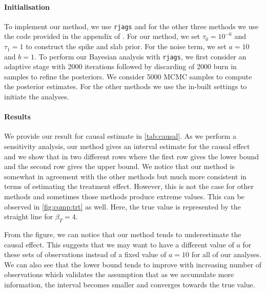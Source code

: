 \documentclass[preprint,12pt]{elsarticle}
\begin{document}
\paragraph{Initialisation} 
To implement our method, we use \texttt{rjags} and for the other three
methods we use the code provided in the appendix of \cite{koch2020}.
For our method, we set $\tau_0=10^{-6}$ and $\tau_1=1$ to construct the
spike and slab prior. For the noise term, we set $a=10$ and $b=1$.  To perform 
our Bayesian analysis with \texttt{rjags}, we first consider an adaptive 
stage with 2000 iterations followed by discarding of 2000 burn in samples 
to refine the posteriors. We consider 5000 MCMC samples to compute the
posterior estimates. For the other methods we use the in-built settings 
to initiate the analyses.

\paragraph{Results}
We provide our result for causal estimate in \cref{tab:causal}. 
As we perform a sensitivity analysis,
our method gives an interval estimate for the causal effect and we show
that in two different rows where the first row gives the lower bound
and the second row gives the upper bound. We notice that our method is 
somewhat in agreement with the other methods but much more consistent
in terms of estimating the treatment effect. However, this is not the
case for other methods and sometimes those methods produce extreme 
values. This can be observed in \cref{fig:comp:trt} as well. Here, the true 
value is represented by the straight line for $\beta_T = 4$. 

From the figure, we can notice that our method tends
to underestimate the causal effect. This suggests that
we may want to have a different value of $a$ for these sets of observations
instead of a fixed value of $a=10$ for all of our analyses.
We can also see that the lower bound tends to improve
with increasing number of observations which validates the assumption that as we accumulate
more information, the interval becomes smaller and converges towards
the true value.
\end{document}
